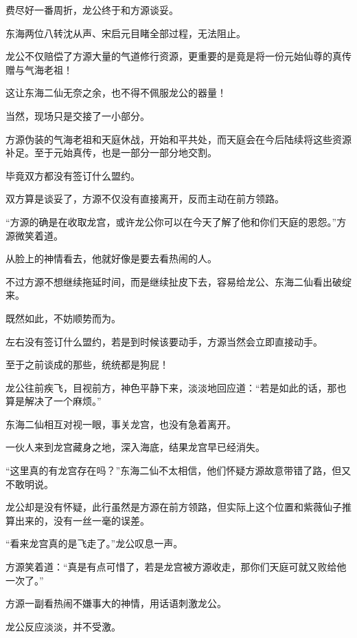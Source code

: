 
\begin{this_body}



费尽好一番周折，龙公终于和方源谈妥。

东海两位八转沈从声、宋启元目睹全部过程，无法阻止。

龙公不仅赔偿了方源大量的气道修行资源，更重要的是竟是将一份元始仙尊的真传赠与气海老祖！

这让东海二仙无奈之余，也不得不佩服龙公的器量！

当然，现场只是交接了一小部分。

方源伪装的气海老祖和天庭休战，开始和平共处，而天庭会在今后陆续将这些资源补足。至于元始真传，也是一部分一部分地交割。

毕竟双方都没有签订什么盟约。

双方算是谈妥了，方源不仅没有直接离开，反而主动在前方领路。

“方源的确是在收取龙宫，或许龙公你可以在今天了解了他和你们天庭的恩怨。”方源微笑着道。

从脸上的神情看去，他就好像是要去看热闹的人。

不过方源不想继续拖延时间，而是继续扯皮下去，容易给龙公、东海二仙看出破绽来。

既然如此，不妨顺势而为。

左右没有签订什么盟约，若是到时候该要动手，方源当然会立即直接动手。

至于之前谈成的那些，统统都是狗屁！

龙公往前疾飞，目视前方，神色平静下来，淡淡地回应道：“若是如此的话，那也算是解决了一个麻烦。”

东海二仙相互对视一眼，事关龙宫，也没有急着离开。

一伙人来到龙宫藏身之地，深入海底，结果龙宫早已经消失。

“这里真的有龙宫存在吗？”东海二仙不太相信，他们怀疑方源故意带错了路，但又不敢明说。

龙公却是没有怀疑，此行虽然是方源在前方领路，但实际上这个位置和紫薇仙子推算出来的，没有一丝一毫的误差。

“看来龙宫真的是飞走了。”龙公叹息一声。

方源笑着道：“真是有点可惜了，若是龙宫被方源收走，那你们天庭可就又败给他一次了。”

方源一副看热闹不嫌事大的神情，用话语刺激龙公。

龙公反应淡淡，并不受激。


\end{this_body}
